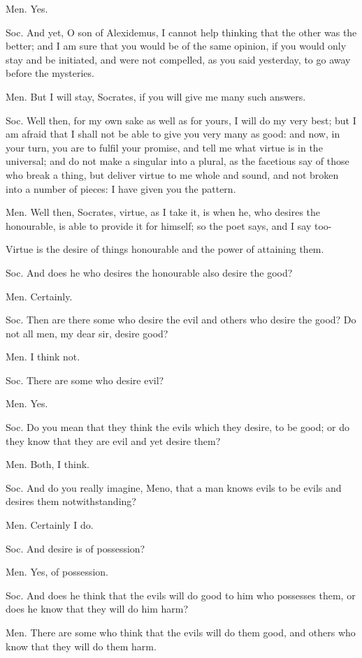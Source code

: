 Men. Yes. 

Soc. And yet, O son of Alexidemus, I cannot help thinking that the
other was the better; and I am sure that you would be of the same
opinion, if you would only stay and be initiated, and were not compelled,
as you said yesterday, to go away before the mysteries. 

Men. But I will stay, Socrates, if you will give me many such answers.

Soc. Well then, for my own sake as well as for yours, I will do my
very best; but I am afraid that I shall not be able to give you very
many as good: and now, in your turn, you are to fulfil your promise,
and tell me what virtue is in the universal; and do not make a singular
into a plural, as the facetious say of those who break a thing, but
deliver virtue to me whole and sound, and not broken into a number
of pieces: I have given you the pattern. 

Men. Well then, Socrates, virtue, as I take it, is when he, who desires
the honourable, is able to provide it for himself; so the poet says,
and I say too- 

Virtue is the desire of things honourable and the power of attaining
them. 

Soc. And does he who desires the honourable also desire the good?

Men. Certainly. 

Soc. Then are there some who desire the evil and others who desire
the good? Do not all men, my dear sir, desire good? 

Men. I think not. 

Soc. There are some who desire evil? 

Men. Yes. 

Soc. Do you mean that they think the evils which they desire, to be
good; or do they know that they are evil and yet desire them?

Men. Both, I think. 

Soc. And do you really imagine, Meno, that a man knows evils to be
evils and desires them notwithstanding? 

Men. Certainly I do. 

Soc. And desire is of possession? 

Men. Yes, of possession. 

Soc. And does he think that the evils will do good to him who possesses
them, or does he know that they will do him harm? 

Men. There are some who think that the evils will do them good, and
others who know that they will do them harm. 

